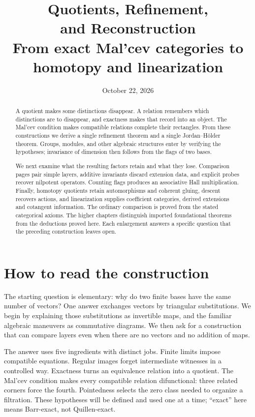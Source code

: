 \documentclass[11pt]{article}
\title{\textbf{Quotients, Refinement,\\and Reconstruction}\\[9pt]\large From exact Mal'cev categories to homotopy and linearization}
\author{}\date{\small October 22, 2026}
\theoremstyle{definition}
\theoremstyle{remark}\newtheorem{remark}[theorem]{Remark}
\begin{document}
\maketitle\thispagestyle{empty}
\begin{abstract}
A quotient makes some distinctions disappear. A relation remembers which
distinctions are to disappear, and exactness makes that record into an
object. The Mal'cev condition makes compatible relations complete their
rectangles. From these constructions we derive a single refinement theorem
and a single Jordan--H\"older theorem. Groups, modules, and other algebraic
structures enter by verifying the hypotheses; invariance of dimension
then follows from the flags of two bases.

We next examine what the resulting factors retain and what they lose.
Comparison pages pair simple layers, additive invariants discard extension
data, and explicit probes recover nilpotent operators. Counting flags
produces an associative Hall multiplication. Finally, homotopy quotients
retain automorphisms and coherent gluing, descent recovers actions, and
linearization supplies coefficient categories, derived extensions and
cotangent information. The ordinary comparison is proved from the stated
categorical axioms. The higher chapters distinguish imported foundational
theorems from the deductions proved here. Each enlargement answers a
specific question that the preceding construction leaves open.
\end{abstract}
\clearpage
\section*{How to read the construction}

The starting question is elementary: why do two finite bases have the same
number of vectors? One answer exchanges vectors by triangular substitutions.
We begin by explaining those substitutions as invertible maps, and the
familiar algebraic maneuvers as commutative diagrams. We then ask for a
construction that can compare layers even when there are no vectors and
no addition of maps.

The answer uses five ingredients with distinct jobs. Finite limits impose
compatible equations. Regular images forget intermediate witnesses in a
controlled way. Exactness turns an equivalence relation into a quotient.
The Mal'cev condition makes every compatible relation difunctional:
three related corners force the fourth. Pointedness selects the zero class
needed to organize a filtration. These hypotheses will be defined and used
one at a time; ``exact'' here means Barr-exact, not Quillen-exact.
\end{document}
